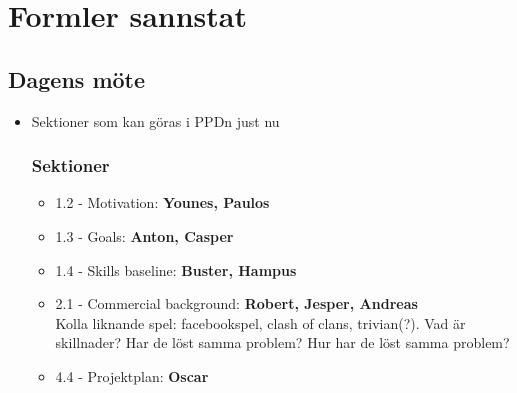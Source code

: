 \documentclass{article}
\begin{document}
\section*{Formler sannstat}

\vspace{12pt}


\subsection{Dagens möte}
\begin{itemize}
    \item Sektioner som kan göras i PPDn just nu
    \subsubsection{Sektioner}
      \begin{itemize}
          \item 1.2 - Motivation: 
                \textbf{Younes, Paulos} 
          \item 1.3 - Goals: 
                \textbf{Anton, Casper} 
          \item 1.4 - Skills baseline: 
                \textbf{Buster, Hampus}
          \item 2.1 - Commercial background: 
                \textbf{Robert, Jesper, Andreas} 
                \\Kolla liknande spel: facebookspel, clash of clans, trivian(?). 
                Vad är skillnader? Har de löst samma problem? Hur har de löst samma problem?
          \item 4.4 - Projektplan:
                \textbf{Oscar} 
      \end{itemize}
\end{itemize}
\end{document}
